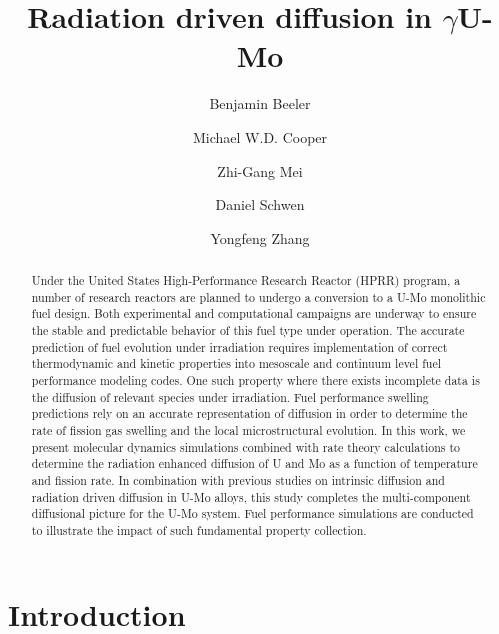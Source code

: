 \documentclass[10pt,review]{elsarticle}
\begin{document}
\begin{frontmatter}
\title{Radiation driven diffusion in $\gamma$U-Mo}

\author[ncsu,inl]{Benjamin Beeler}
\author[lanl]{Michael W.D. Cooper}
\author[anl]{Zhi-Gang Mei}
\author[inl]{Daniel Schwen}
\author[wisc,inl]{Yongfeng Zhang}
\address[ncsu]{North Carolina State University, Raleigh, NC 27695}
\address[inl]{Idaho National Laboratory, Idaho Falls, ID 83415}
\address[lanl]{Los Alamos National Laboratory, Los Alamos, NM 87545}
\address[anl]{Argonne National Laboratory, Lemont, IL 60439}
\address[wisc]{University of Wisconsin-Madison, Madison, WI 53715}

\begin{abstract}
Under the United States High-Performance Research Reactor (HPRR) program, a number of research reactors are planned to undergo a conversion to a U-Mo monolithic fuel design. Both experimental and computational campaigns are underway to ensure the stable and predictable behavior of this fuel type under operation. The accurate prediction of fuel evolution under irradiation requires implementation of correct thermodynamic and kinetic properties into mesoscale and continuum level fuel performance modeling codes. One such property where there exists incomplete data is the diffusion of relevant species under irradiation. Fuel performance swelling predictions rely on an accurate representation of diffusion in order to determine the rate of fission gas swelling and the local microstructural evolution. In this work, we present molecular dynamics simulations combined with rate theory calculations to determine the radiation enhanced diffusion of U and Mo as a function of temperature and fission rate. In combination with previous studies on intrinsic diffusion and radiation driven diffusion in U-Mo alloys, this study completes the multi-component diffusional picture for the U-Mo system. Fuel performance simulations are conducted to illustrate the impact of such fundamental property collection. 

\end{abstract}
\end{frontmatter}

\linenumbers
\modulolinenumbers[5]

\section{Introduction}
\end{document}

